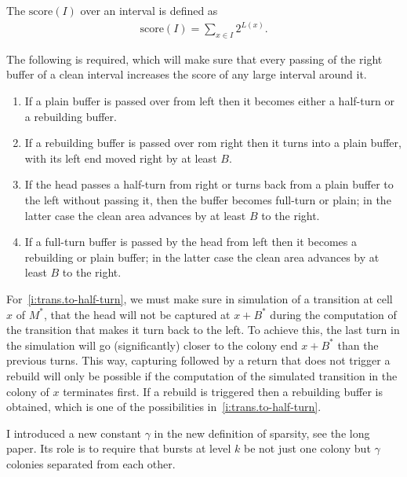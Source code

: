 \documentclass[12pt]{memoir}
\def\B{B}
\newcommand{\score}{\mathrm{score}}
\begin{document}
The  \( \score(I) \) over an interval is defined as
 \begin{align}\label{eq:score}
  \score(I)=\sum_{x\in I}2^{L(x)}.
 \end{align}

The following is required, which will make sure that every passing of the right
buffer of a clean interval increases the score of any large interval around it.

\begin{enumerate}[label=\upshape{(T\arabic*)}, ref=T\arabic*]
\item\label{i:trans.to-half-turn} If a plain buffer is passed over from left
then it becomes either a half-turn or a rebuilding buffer.

\item If a rebuilding buffer is passed over rom right then
it turns into a plain buffer, with its left end moved right by at least \( \B \).

\item If the head passes a half-turn from right or turns back from a plain buffer
to the left without passing it, then the buffer becomes
full-turn or plain; in the latter case the clean area advances by at least
\( \B \) to the right.

\item If a full-turn buffer is passed by the head from left then it
becomes a rebuilding or plain buffer; 
in the latter case the clean area advances by at least \( \B \) to the right.

\end{enumerate}

For~\eqref{i:trans.to-half-turn}, we must make sure in simulation of a transition at
cell \( x \) of \( M^{*} \),
that the head will not be captured at \( x+\B^{*} \) during the computation of the transition
that makes it turn back to the left.
To achieve this, the last turn in the simulation will go (significantly)
closer to the colony end \( x+\B^{*} \) than the previous turns.
This way, capturing followed by a return that does not trigger a rebuild
will only be possible if the computation of the simulated transition in the colony of \( x \)
terminates first.
If a rebuild is triggered then a rebuilding buffer is obtained, which is one of the possibilities
in~\eqref{i:trans.to-half-turn}.

I introduced a new constant \( \gamma \) 
in the new definition of sparsity, see the long paper.
Its role is to require that bursts at level \( k \) be
not just one colony but \( \gamma \) colonies separated from each other.
\end{document}
